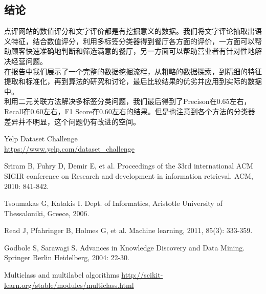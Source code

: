 \documentclass[a4paper, twocolumn]{article}
\begin{document}
\begin{CJK}{UTF8}{gbsn}
	\section{结论}
	点评网站的数值评分和文字评价都是有挖掘意义的数据。我们将文字评论抽取出语义特征，结合数值评分，利用多标签分类器得到餐厅各方面的评价，一方面可以帮助顾客快速准确地判断和筛选满意的餐厅，另一方面可以帮助营业者有针对性地解决经营问题。\\
	在报告中我们展示了一个完整的数据挖掘流程，从粗略的数据探索，到精细的特征提取和标准化，再到算法的研究和讨论，最后比较结果的优劣并应用到实际的数据中。\\
	利用二元关联方法解决多标签分类问题，我们最后得到了Precison在0.65左右，Recall在0.60左右，F1 Score在0.60左右的结果。但是也注意到各个方法的分类器差异并不明显，这个问题仍有改进的空间。
	
	\renewcommand{\refname}{参考文献}
	\begin{thebibliography}{99} %

		Yelp Dataset Challenge\\
		\newblock \url{https://www.yelp.com/dataset_challenge}
		
		Sriram B, Fuhry D, Demir E, et al. 
		 \newblock Proceedings of the 33rd international ACM SIGIR conference on Research and development in information retrieval. ACM, 2010: 841-842.
		
		Tsoumakas G, Katakis I. 
		\newblock Dept. of Informatics, Aristotle University of Thessaloniki, Greece, 2006.
		
		Read J, Pfahringer B, Holmes G, et al. 
		\newblock Machine learning, 2011, 85(3): 333-359.
		
		Godbole S, Sarawagi S. 
		\newblock Advances in Knowledge Discovery and Data Mining. Springer Berlin Heidelberg, 2004: 22-30.
		
		Multiclass and multilabel algorithms
		\newblock \url{http://scikit-learn.org/stable/modules/multiclass.html}
		
		
	\end{thebibliography}
	
\end{CJK}	
\end{document}

